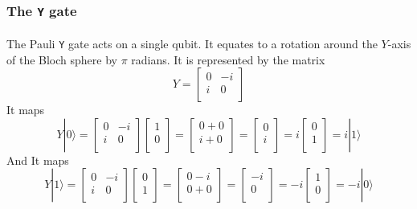\documentclass[a4paper,10pt]{article}
\begin{document}
\subsubsection{The \texttt{Y} gate}

\paragraph{} The Pauli \texttt{Y} gate acts on a single qubit. It equates to a rotation around the $Y$-axis of the Bloch sphere by $\pi$ radians. It is represented by the matrix
$$Y = \begin{bmatrix}
0 & -i \\
i & 0 \\
\end{bmatrix}$$
It maps
$$Y|0\rangle = \begin{bmatrix}
0 & -i \\
i & 0 \\
\end{bmatrix} \begin{bmatrix}
1 \\
0 \\
\end{bmatrix} = \begin{bmatrix}
0+0 \\
i+0 \\
\end{bmatrix} = \begin{bmatrix}
0 \\
i \\
\end{bmatrix} = i\begin{bmatrix}
0 \\
1 \\
\end{bmatrix} = i|1\rangle$$
And
It maps
$$Y|1\rangle = \begin{bmatrix}
0 & -i \\
i & 0 \\
\end{bmatrix} \begin{bmatrix}
0 \\
1 \\
\end{bmatrix} = \begin{bmatrix}
0-i \\
0+0 \\
\end{bmatrix} = \begin{bmatrix}
-i \\
0 \\
\end{bmatrix} = -i\begin{bmatrix}
1 \\
0 \\
\end{bmatrix} = -i|0\rangle$$
\end{document}
